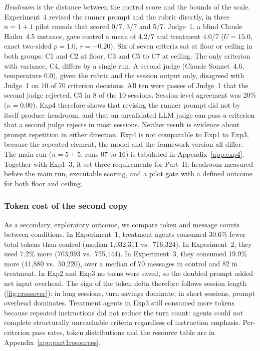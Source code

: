 \documentclass[11pt,a4paper]{article}
\begin{document}
\emph{Headroom} is the distance between the control score and the bounds of the scale.
Experiment~4 revised the runner prompt and the rubric directly, in three $n{=}1{+}1$ pilot rounds that scored 0/7, 3/7 and 5/7.
Judge~1, a blind Claude Haiku~4.5 instance, gave control a mean of 4.2/7 and treatment 4.0/7 ($U{=}15.0$, exact two-sided $p{=}1.0$, $r{=}-0.20$).
Six of seven criteria sat at floor or ceiling in both groups: C1 and C2 at floor, C3 and C5 to C7 at ceiling.
The only criterion with variance, C4, differs by a single run.
A second judge (Claude Sonnet~4.6, temperature 0.0), given the rubric and the session output only, disagreed with Judge~1 on 10 of 70 criterion decisions.
All ten were passes of Judge~1 that the second judge rejected, C5 in 8 of the 10 sessions.
Session-level agreement was 20\% ($\kappa{=}0.00$).
Exp4 therefore shows that revising the runner prompt did not by itself produce headroom, and that an unvalidated LLM judge can pass a criterion that a second judge rejects in most sessions.
Neither result is evidence about prompt repetition in either direction.
Exp4 is not comparable to Exp1 to Exp3, because the repeated element, the model and the framework version all differ.
The main run ($n{=}5{+}5$, runs 07 to 16) is tabulated in Appendix~\ref{app:exp4}.
Together with Exp1--3, it set three requirements for Part~II: headroom measured before the main run, executable scoring, and a pilot gate with a defined outcome for both floor and ceiling.

\subsubsection{Token cost of the second copy}

As a secondary, exploratory outcome, we compare token and message counts between conditions.
In Experiment~1, treatment agents consumed 30.6\% fewer total tokens than control (median 1{,}032{,}311 vs.\ 716{,}324).
In Experiment~2, they used 7.2\% more (703{,}993 vs.\ 755{,}144).
In Experiment~3, they consumed 19.9\% more (41{,}880 vs.\ 50{,}220), over a median of 70 messages in control and 82 in treatment.
In Exp2 and Exp3 no turns were saved, so the doubled prompt added net input overhead.
The sign of the token delta therefore follows session length (\autoref{fig:crossover}): in long sessions, turn savings dominate; in short sessions, prompt overhead dominates.
Treatment agents in Exp3 still consumed more tokens because repeated instructions did not reduce the turn count: agents could not complete structurally unreachable criteria regardless of instruction emphasis.
Per-criterion pass rates, token distributions and the resource table are in Appendix~\ref{app:part1resources}.
\end{document}
